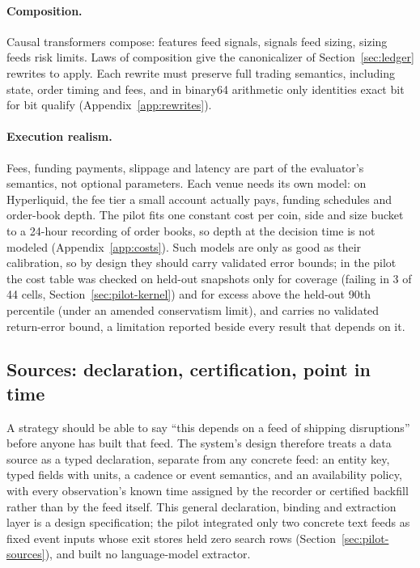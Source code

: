 \documentclass[11pt]{article}
\begin{document}
\paragraph{Composition.} Causal transformers compose: features feed signals, signals feed sizing, sizing feeds risk limits. Laws of composition give the canonicalizer of Section~\ref{sec:ledger} rewrites to apply. Each rewrite must preserve full trading semantics, including state, order timing and fees, and in binary64 arithmetic only identities exact bit for bit qualify (Appendix~\ref{app:rewrites}).

\paragraph{Execution realism.} Fees, funding payments, slippage and latency are part of the evaluator's semantics, not optional parameters. Each venue needs its own model: on Hyperliquid, the fee tier a small account actually pays, funding schedules and order-book depth. The pilot fits one constant cost per coin, side and size bucket to a 24-hour recording of order books, so depth at the decision time is not modeled (Appendix~\ref{app:costs}). Such models are only as good as their calibration, so by design they should carry validated error bounds; in the pilot the cost table was checked on held-out snapshots only for coverage (failing in 3 of 44 cells, Section~\ref{sec:pilot-kernel}) and for excess above the held-out 90th percentile (under an amended conservatism limit), and carries no validated return-error bound, a limitation reported beside every result that depends on it.

\subsection{Sources: declaration, certification, point in time}\label{sec:sources}

A strategy should be able to say ``this depends on a feed of shipping disruptions'' before anyone has built that feed. The system's design therefore treats a data source as a typed declaration, separate from any concrete feed: an entity key, typed fields with units, a cadence or event semantics, and an availability policy, with every observation's known time assigned by the recorder or certified backfill rather than by the feed itself. This general declaration, binding and extraction layer is a design specification; the pilot integrated only two concrete text feeds as fixed event inputs whose exit stores held zero search rows (Section~\ref{sec:pilot-sources}), and built no language-model extractor.
\end{document}
